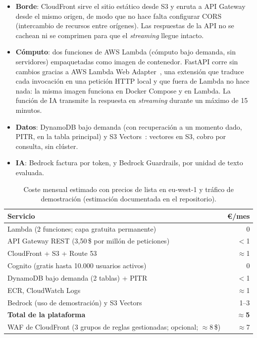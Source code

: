 \begin{itemize}
  \item \textbf{Borde}: CloudFront sirve el sitio estático desde S3 y enruta  a API
        Gateway desde el mismo origen, de modo que no hace falta configurar CORS (intercambio
        de recursos entre orígenes). Las respuestas de la API no se cachean ni se
        comprimen para que el \emph{streaming} llegue intacto.
  \item \textbf{Cómputo}: dos funciones de AWS Lambda (cómputo bajo demanda, sin servidores)
        empaquetadas como imagen de contenedor. FastAPI corre sin cambios gracias a
        AWS Lambda Web Adapter~\cite{awslwa}, una extensión que traduce cada invocación en una
        petición HTTP local y que fuera de Lambda no hace nada: la misma imagen funciona en Docker
        Compose y en Lambda. La función de IA transmite la respuesta en \emph{streaming} durante un máximo de
        15 minutos.
  \item \textbf{Datos}: DynamoDB bajo demanda (con recuperación a un momento dado, PITR, en la tabla
        principal) y S3 Vectors~\cite{aws2025s3vectors}: vectores en S3, cobro por consulta, sin clúster.
  \item \textbf{IA}: Bedrock factura por token, y Bedrock Guardrails, por unidad de texto evaluada.
\end{itemize}

\begin{table}[t]
\centering\scriptsize
\caption{Coste mensual estimado con precios de lista en eu-west-1 y tráfico de demostración (estimación documentada en el repositorio).}\label{tab:coste}
\begin{tabularx}{\columnwidth}{@{}Yr@{}}
\toprule
\textbf{Servicio} & \textbf{€/mes} \\
\midrule
Lambda (2 funciones; capa gratuita permanente) & 0 \\
API Gateway REST (3,50\,\$ por millón de peticiones) & $<$1 \\
CloudFront + S3 + Route 53 & $\approx$1 \\
Cognito (gratis hasta 10.000 usuarios activos) & 0 \\
DynamoDB bajo demanda (2 tablas) + PITR & $<$1 \\
ECR, CloudWatch Logs & $\approx$1 \\
Bedrock (uso de demostración) y S3 Vectors & 1--3 \\
\midrule
\textbf{Total de la plataforma} & \textbf{$\approx$5} \\
WAF de CloudFront (3 grupos de reglas gestionadas; opcional; $\approx$8\,\$) & $\approx$7 \\
\bottomrule
\end{tabularx}
\end{table}

